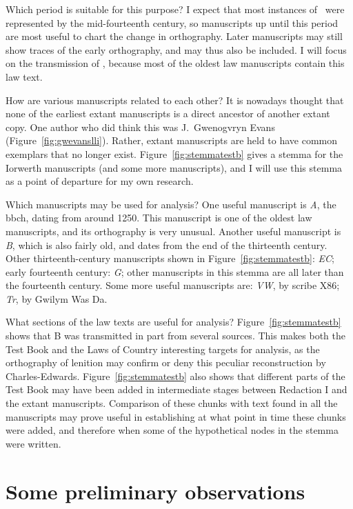 Which period is suitable for this purpose?
I expect that most instances of \lT\ were represented by the mid-fourteenth century, so manuscripts up until this period are most useful to chart the change in orthography.
Later manuscripts may still show traces of the early orthography, and may thus also be included.
I will focus on the transmission of , because most of the oldest law manuscripts contain this law text.

How are various manuscripts related to each other?
It is nowadays thought that none of the earliest extant manuscripts is a direct ancestor of another extant copy.
One author who did think this was J.\ Gwenogvryn Evans (Figure~\ref{fig:gwevanslli}).
Rather, extant manuscripts are held to have common exemplars that no longer exist.
Figure~\ref{fig:stemmatestb} gives a stemma for the Iorwerth manuscripts (and some more manuscripts), and I will use this stemma as a point of departure for my own research.

Which manuscripts may be used for analysis?
One useful manuscript is \textit{A}, the \gls{bbch}, dating from around 1250. This manuscript is one of the oldest law manuscripts, and its orthography is very unusual.
Another useful manuscript is \textit{B}, which is also fairly old, and dates from the end of the thirteenth century.
Other thirteenth-century manuscripts shown in Figure~\ref{fig:stemmatestb}: \textit{EC};
early fourteenth century: \textit{G};
other manuscripts in this stemma are all later than the fourteenth century.
Some more useful manuscripts are: \textit{VW}, by scribe X86; \textit{Tr}, by Gwilym Was Da.

What sections of the law texts are useful for analysis?
Figure~\ref{fig:stemmatestb} shows that B was  transmitted in part from several sources. This makes both the Test Book and the Laws of Country interesting targets for analysis, as the orthography of lenition may confirm or deny this peculiar reconstruction by Charles-Edwards.
Figure~\ref{fig:stemmatestb} also shows that different parts of the Test Book may have been added in intermediate stages between Redaction I and the extant manuscripts.
Comparison of these chunks with text found in all the manuscripts may prove useful in establishing at what point in time these chunks were added, and therefore when some of the hypothetical nodes in the stemma were written.

\section{Some preliminary observations}
\label{sec:some-prel-observ}

